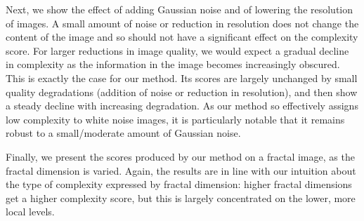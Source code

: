 \documentclass[a4paper,fleqn]{cas-sc}
\theoremstyle{remark}
\begin{document}
Next, we show the effect of adding Gaussian noise and of lowering the resolution of images. A small amount of noise or reduction in resolution does not change the content of the image and so should not have a significant effect on the complexity score. For larger reductions in image quality, we would expect a gradual decline in complexity as the information in the image becomes increasingly obscured. This is exactly the case for our method. Its scores are largely unchanged by small quality degradations (addition of noise or reduction in resolution), and then show a steady decline with increasing degradation. As our method so effectively assigns low complexity to white noise images, it is particularly notable that it remains robust to a small/moderate amount of Gaussian noise.

Finally, we present the scores produced by our method on a fractal image, as the fractal dimension is varied. Again, the results are in line with our intuition about the type of complexity expressed by fractal dimension: higher fractal dimensions get a higher complexity score, but this is largely concentrated on the lower, more local levels.
\end{document}
